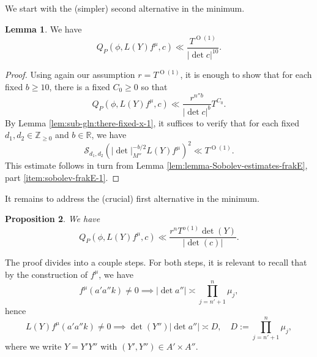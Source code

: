 \documentclass[reqno]{amsart}
\def\O{\operatorname{O}}
\theoremstyle{plain} \newtheorem{theorem} {Theorem}
\newtheorem{proposition} [theorem] {Proposition}
\theoremstyle{definition} \newtheorem{definition} [theorem] {Definition}
\theoremstyle{itplain} %
\newtheorem{lemma}[theorem]{Lemma}
\numberwithin{equation}{section}
\numberwithin{theorem}{section}
\renewcommand{\geq}{\geqslant}
\begin{document}
We start with the (simpler) second alternative in the minimum.
\begin{lemma}\label{lem:standard:we-have-begin-first-alternative}
  We have
  \begin{equation*}
    Q_P(\phi, L(Y) f^\mu , c)
    \ll
    \frac{T^{\O(1)}}{|\det c|^{10}}.
  \end{equation*}
\end{lemma}
\begin{proof}
  Using again our assumption $r = T^{\O(1)}$, it is enough to show that for each fixed $b \geq 10$, there is a fixed $C_0 \geq 0$ so that
  \begin{equation*}
    Q_P(\phi, L(Y) f^\mu, c) \ll
    \frac{r^{n'' b}}{|\det c|^{b}} T^{C_0}.
  \end{equation*}
  By Lemma \ref{lem:sub-gln:there-fixed-x-1}, it suffices to verify that for each fixed $d_{1}, d_2 \in \mathbb{Z}_{\geq 0}$ and $b \in \mathbb{R}$, we have
  \begin{equation}\label{eq:mathc-d_2-left}
    \mathcal{S}_{d_1,d_2} \left(
      |\det|_{M''}^{-b/2} L(Y) f^\mu
    \right)^2 \ll T^{\O(1)}.
  \end{equation}
  This estimate follows in turn from Lemma \ref{lem:lemma-Sobolev-estimates-frakE}, part \eqref{item:sobolev-frakE-1}.
\end{proof}

It remains to address the (crucial) first alternative in the minimum.
\begin{proposition}\label{prop:standard:we-have-begin-second-alternative}
We have
\begin{equation}\label{eq:qpphi-ly-fmu}
  Q_P(\phi, L(Y) f^\mu , c)
  \ll
  \frac{r^n T^{o(1)} \det(Y)}{|\det (c)|}.
\end{equation}
\end{proposition}
The proof divides into a couple steps.  For both steps, it is relevant to recall that by the construction of $f^\mu$, we have
\begin{equation*}
  f^\mu (a' a'' k) \neq 0 \implies |\det a''| \asymp \prod_{j=n' + 1}^{n} \mu_j,
\end{equation*}
hence
\begin{equation}\label{eq:ly-fmua-a}
  L(Y) f^\mu(a' a'' k) \neq 0 \implies  \det(Y'') |\det a''| \asymp D , \quad D := \prod_{j=n'+1}^{n} \mu_j,
\end{equation}
where we write $Y = Y' Y''$ with $(Y', Y'') \in A' \times A''$.
\end{document}
